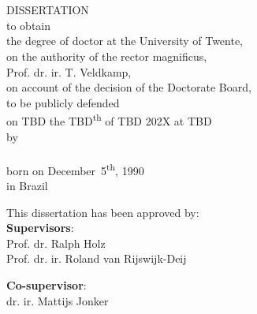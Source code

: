 \thispagestyle{empty}
\begin{center}
\vspace*{2.0cm}
\Large \textbf{\MakeUppercase{\ThesisTitle}} \\
\vspace*{0.2cm}
{\large \MakeUppercase{\ThesisSubTitle}} \\
\vspace*{1.5cm}
\normalsize DISSERTATION \\
\vspace*{1.5cm}
to obtain \\ %
the degree of doctor at the University of Twente, \\ %
on the authority of the rector magnificus, \\ %
Prof. dr. ir. T. Veldkamp, \\
on account of the decision of the Doctorate Board, \\ %
to be publicly defended \\ %
on TBD the TBD\textsuperscript{th} of TBD 202X at TBD \\
\vspace*{1cm}
by \\ %
\vspace*{1cm}
\large \AuthorName \\
\vspace*{1cm}
\normalsize born on December~5\textsuperscript{th}, 1990 \\ in Brazil
\end{center}
\clearpage


\thispagestyle{empty}
\begin{flushleft}
This dissertation has been approved by: \\ %

\vspace*{1\baselineskip}
\textbf{Supervisors}:\\
Prof. dr. Ralph Holz \\
Prof. dr. ir. Roland van Rijswijk-Deij \\

\vspace{0.2cm}

\textbf{Co-supervisor}:\\
dr. ir. Mattijs Jonker \\

\end{flushleft}
\clearpage

\thispagestyle{empty}
\clearpage
